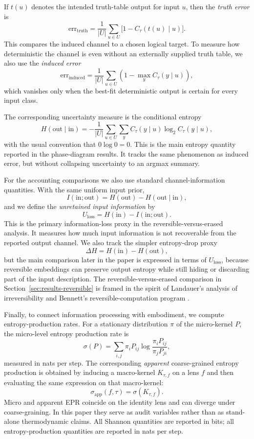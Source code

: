 \documentclass[11pt]{article}
\theoremstyle{definition}
\begin{document}
If \(t(u)\) denotes the intended truth-table output for input \(u\), then the \emph{truth error} is
\[
\mathrm{err}_{\mathrm{truth}}
=
\frac{1}{|U|}
\sum_{u\in U}
\bigl[1 - C_\tau(t(u)\mid u)\bigr].
\]
This compares the induced channel to a chosen logical target. To measure how deterministic the channel is even without an externally supplied truth table, we also use the \emph{induced error}
\[
\mathrm{err}_{\mathrm{induced}}
=
\frac{1}{|U|}
\sum_{u\in U}
\left(1-\max_{y} C_\tau(y\mid u)\right),
\]
which vanishes only when the best-fit deterministic output is certain for every input class.

The corresponding uncertainty measure is the conditional entropy
\[
H(\mathrm{out}\mid \mathrm{in})
=
-
\frac{1}{|U|}
\sum_{u\in U}\sum_y
C_\tau(y\mid u)\log_2 C_\tau(y\mid u),
\]
with the usual convention that \(0\log 0 = 0\). This is the main entropy quantity reported in the phase-diagram results. It tracks the same phenomenon as induced error, but without collapsing uncertainty to an argmax summary.

For the accounting comparisons we also use standard channel-information quantities. With the same uniform input prior,
\[
I(\mathrm{in};\mathrm{out})
=
H(\mathrm{out}) - H(\mathrm{out}\mid \mathrm{in}),
\]
and we define the \emph{unretained input information} by
\[
U_{\text{loss}}
=
H(\mathrm{in}) - I(\mathrm{in};\mathrm{out}).
\]
This is the primary information-loss proxy in the reversible-versus-erased analysis. It measures how much input information is not recoverable from the reported output channel. We also track the simpler entropy-drop proxy
\[
\Delta H = H(\mathrm{in}) - H(\mathrm{out}),
\]
but the main comparison later in the paper is expressed in terms of \(U_{\text{loss}}\), because reversible embeddings can preserve output entropy while still hiding or discarding part of the input description.
The reversible-versus-erased comparison in Section~\ref{sec:results-reversible} is framed in the spirit of Landauer's analysis of irreversibility and Bennett's reversible-computation program \cite{landauer1961,bennett1973}.

Finally, to connect information processing with embodiment, we compute entropy-production rates. For a stationary distribution \(\pi\) of the micro-kernel \(P\), the micro-level entropy production rate is
\[
\sigma(P)
=
\sum_{i,j}
\pi_i P_{ij}
\log
\frac{\pi_i P_{ij}}{\pi_j P_{ji}},
\]
measured in nats per step. The corresponding \emph{apparent} coarse-grained entropy production is obtained by inducing a macro-kernel \(K_{\tau,f}\) on a lens \(f\) and then evaluating the same expression on that macro-kernel:
\[
\sigma_{\mathrm{app}}(f,\tau)
=
\sigma(K_{\tau,f}).
\]
Micro and apparent EPR coincide on the identity lens and can diverge under coarse-graining. In this paper they serve as audit variables rather than as stand-alone thermodynamic claims. All Shannon quantities are reported in bits; all entropy-production quantities are reported in nats per step.
\end{document}
